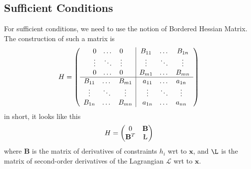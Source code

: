 \documentclass[11pt,a4paper]{book}
\theoremstyle{definition}\newtheorem{definition}{Definition}
\theoremstyle{definition}\newtheorem{fact}{Fact}
\theoremstyle{definition}\newtheorem{remark}{Remark}
\theoremstyle{definition}\newtheorem{ex}{Ex.}
\theoremstyle{definition}\newtheorem{project}{Project}
\theoremstyle{definition}\newtheorem{problem}{Problem}
\theoremstyle{definition}\newtheorem{example}{Example}
\numberwithin{theorem}{section}
\numberwithin{corollary}{chapter}
\numberwithin{assumption}{chapter}
\numberwithin{definition}{chapter}
\numberwithin{prop}{chapter}
\numberwithin{notation}{chapter}
\numberwithin{problem}{chapter}
\numberwithin{example}{chapter}
\numberwithin{fact}{chapter}
\numberwithin{ex}{chapter}
\def\B{\mathbf B}
\def\x{\mathbf x}
\begin{document}
	\subsection{Sufficient Conditions}
	For sufficient conditions, we need to use the notion of Bordered Hessian Matrix. The construction of such a matrix is
	\begin{equation*}
		H = \left( \begin{array}{c | c}
			\begin{matrix}
				0      & \dots  & 0      \\
				\vdots & \ddots & \vdots \\
				0      & \dots  & 0      
			\end{matrix} & 
			\begin{matrix}
				B_{11} & \dots  & B_{1n} \\
				\vdots & \ddots & \vdots \\
				B_{m1} & \dots  & B_{mn} 
			\end{matrix} \\
			\hline
			\begin{matrix}
				B_{11} & \dots  & B_{m1} \\
				\vdots & \ddots & \vdots \\
				B_{1n} & \dots  & B_{mn} 
			\end{matrix} & 
			\begin{matrix}
				a_{11} & \dots  & a_{1n} \\
				\vdots & \ddots & \vdots \\
				a_{1n} & \dots  & a_{nn} 
			\end{matrix}
		\end{array} \right)
	\end{equation*}
	in short, it looks like this
	\begin{align*}
		H = \begin{pmatrix}
			0 & \B \\ \B^T & \L
		\end{pmatrix}
	\end{align*}
	where $\B$ is the matrix of derivatives of constraints $h_i$ wrt to $\x$, and $\L$ is the matrix of second-order derivatives of the Lagrangian $\mathcal{L}$ wrt to $\x$. 
	
\end{document}
